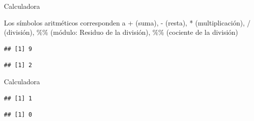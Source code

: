 \documentclass[ignorenonframetext,]{beamer}
\newenvironment{Shaded}{\begin{snugshade}}{\end{snugshade}}
\newcommand{\DecValTok}[1]{\textcolor[rgb]{0.00,0.00,0.81}{#1}}
\newcommand{\StringTok}[1]{\textcolor[rgb]{0.31,0.60,0.02}{#1}}
\newcommand{\OperatorTok}[1]{\textcolor[rgb]{0.81,0.36,0.00}{\textbf{#1}}}
\begin{document}
\begin{frame}[fragile]{Calculadora}

Los símbolos aritméticos corresponden a + (suma), - (resta), *
(multiplicación), / (división), \%\% (módulo: Residuo de la división),
\%\% (cociente de la división)

\begin{Shaded}
\end{Shaded}

\begin{verbatim}
## [1] 9
\end{verbatim}

\begin{Shaded}
\end{Shaded}

\begin{verbatim}
## [1] 2
\end{verbatim}

\end{frame}

\begin{frame}[fragile]{Calculadora}

\begin{Shaded}
\end{Shaded}

\begin{verbatim}
## [1] 1
\end{verbatim}

\begin{Shaded}
\end{Shaded}

\begin{verbatim}
## [1] 0
\end{verbatim}

\end{frame}
\end{document}
